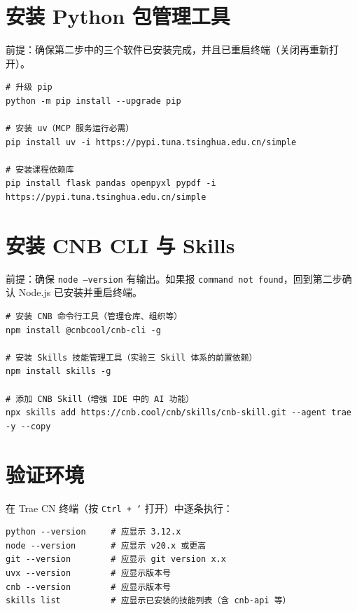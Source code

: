 \section{安装 Python 包管理工具}

前提：确保第二步中的三个软件已安装完成，并且已重启终端（关闭再重新打开）。

\begin{lstlisting}[style=shell]
# 升级 pip
python -m pip install --upgrade pip

# 安装 uv（MCP 服务运行必需）
pip install uv -i https://pypi.tuna.tsinghua.edu.cn/simple

# 安装课程依赖库
pip install flask pandas openpyxl pypdf -i https://pypi.tuna.tsinghua.edu.cn/simple
\end{lstlisting}

\section{安装 CNB CLI 与 Skills}

前提：确保 \texttt{node --version} 有输出。如果报 \texttt{command not found}，回到第二步确认 Node.js 已安装并重启终端。

\begin{lstlisting}[style=shell]
# 安装 CNB 命令行工具（管理仓库、组织等）
npm install @cnbcool/cnb-cli -g

# 安装 Skills 技能管理工具（实验三 Skill 体系的前置依赖）
npm install skills -g

# 添加 CNB Skill（增强 IDE 中的 AI 功能）
npx skills add https://cnb.cool/cnb/skills/cnb-skill.git --agent trae -y --copy
\end{lstlisting}

\section{验证环境}

在 Trae CN 终端（按 \texttt{Ctrl + `} 打开）中逐条执行：

\begin{lstlisting}[style=shell]
python --version     # 应显示 3.12.x
node --version       # 应显示 v20.x 或更高
git --version        # 应显示 git version x.x
uvx --version        # 应显示版本号
cnb --version        # 应显示版本号
skills list          # 应显示已安装的技能列表（含 cnb-api 等）
\end{lstlisting}

